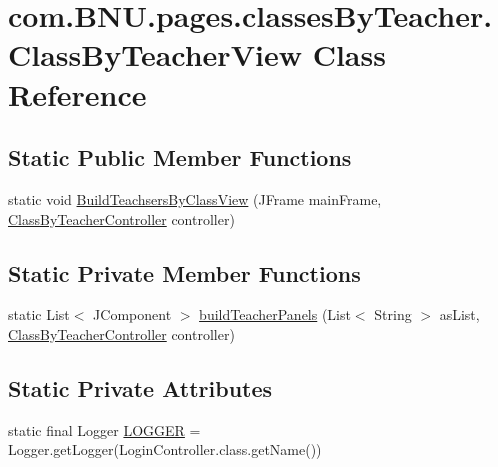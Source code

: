\hypertarget{classcom_1_1_b_n_u_1_1pages_1_1classes_by_teacher_1_1_class_by_teacher_view}{}\section{com.\+B\+N\+U.\+pages.\+classes\+By\+Teacher.\+Class\+By\+Teacher\+View Class Reference}
\label{classcom_1_1_b_n_u_1_1pages_1_1classes_by_teacher_1_1_class_by_teacher_view}
\subsection*{Static Public Member Functions}
\begin{DoxyCompactItemize}
\item 
static void \mbox{\hyperlink{classcom_1_1_b_n_u_1_1pages_1_1classes_by_teacher_1_1_class_by_teacher_view_a91349396c9bcea8c3a61d62edd0c9b10}{Build\+Teachsers\+By\+Class\+View}} (J\+Frame main\+Frame, \mbox{\hyperlink{classcom_1_1_b_n_u_1_1pages_1_1classes_by_teacher_1_1_class_by_teacher_controller}{Class\+By\+Teacher\+Controller}} controller)
\end{DoxyCompactItemize}
\subsection*{Static Private Member Functions}
\begin{DoxyCompactItemize}
\item 
static List$<$ J\+Component $>$ \mbox{\hyperlink{classcom_1_1_b_n_u_1_1pages_1_1classes_by_teacher_1_1_class_by_teacher_view_a670ad464170daadade2394a314aa1797}{build\+Teacher\+Panels}} (List$<$ String $>$ as\+List, \mbox{\hyperlink{classcom_1_1_b_n_u_1_1pages_1_1classes_by_teacher_1_1_class_by_teacher_controller}{Class\+By\+Teacher\+Controller}} controller)
\end{DoxyCompactItemize}
\subsection*{Static Private Attributes}
\begin{DoxyCompactItemize}
\item 
static final Logger \mbox{\hyperlink{classcom_1_1_b_n_u_1_1pages_1_1classes_by_teacher_1_1_class_by_teacher_view_a3d7442b144bc4f8bad48ee8080907d7d}{L\+O\+G\+G\+ER}} = Logger.\+get\+Logger(Login\+Controller.\+class.\+get\+Name())
\end{DoxyCompactItemize}


